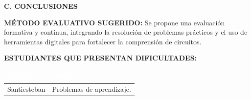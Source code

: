\documentclass[a4paper,12pt]{article}
\begin{document}
\vspace{0.5cm}

\begin{center}\fontsize{12pt}{14pt}\selectfont \textbf{\uppercase{C. CONCLUSIONES}}\end{center}

\textbf{MÉTODO EVALUATIVO SUGERIDO:}
Se propone una evaluación formativa y continua, integrando la resolución de problemas prácticos y el uso de herramientas digitales para fortalecer la comprensión de circuitos.

\vspace{0.3cm}
\textbf{ESTUDIANTES QUE PRESENTAN DIFICULTADES:}

\begin{center}
\begin{tabular}{|p{7cm}|p{8cm}|}
  \hline
  \rowcolor{headerblue}
  \textcolor{white}{\textbf{Alumnos}} & \textcolor{white}{\textbf{Dificultad}} \\
  \hline
  Santiesteban & Problemas de aprendizaje. \\
  \hline
\end{tabular}
\end{center}
\end{document}
